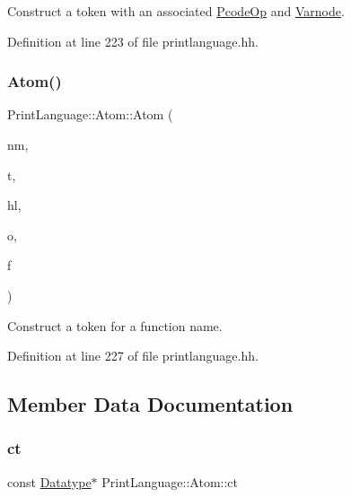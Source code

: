 Construct a token with an associated \mbox{\hyperlink{class_pcode_op}{Pcode\+Op}} and \mbox{\hyperlink{class_varnode}{Varnode}}. 



Definition at line 223 of file printlanguage.\+hh.

\mbox{\label{struct_print_language_1_1_atom_ac0e4eb3d9a0590545aa63ae5e223138f}} 
\subsubsection{\texorpdfstring{Atom()}{Atom()}\hspace{0.1cm}{\footnotesize\ttfamily [6/6]}}
{\footnotesize\ttfamily Print\+Language\+::\+Atom\+::\+Atom (\begin{DoxyParamCaption}\item[{const string \&}]{nm,  }\item[{\mbox{\hyperlink{class_print_language_a7102f70f47777d8b17af52c5157c473e}{tagtype}}}]{t,  }\item[{\mbox{\hyperlink{class_emit_xml_a7c3577436da429c3c75f4b82cac6864f}{Emit\+Xml\+::syntax\+\_\+highlight}}}]{hl,  }\item[{const \mbox{\hyperlink{class_pcode_op}{Pcode\+Op}} $\ast$}]{o,  }\item[{const \mbox{\hyperlink{class_funcdata}{Funcdata}} $\ast$}]{f }\end{DoxyParamCaption})\hspace{0.3cm}{\ttfamily [inline]}}



Construct a token for a function name. 



Definition at line 227 of file printlanguage.\+hh.



\subsection{Member Data Documentation}
\mbox{\label{struct_print_language_1_1_atom_ae9e9b65a722c2e164e68b9570db3a695}} 
\subsubsection{\texorpdfstring{ct}{ct}}
{\footnotesize\ttfamily const \mbox{\hyperlink{class_datatype}{Datatype}}$\ast$ Print\+Language\+::\+Atom\+::ct}



